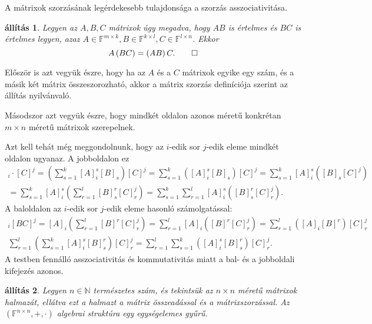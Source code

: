 \documentclass[9pt, a4paper, showtrims]{memoir}
\makeatletter
\renewenvironment{proof}[1][\proofname]
    {\par\pushQED{\qed}%
    \normalfont \topsep6\p@\@plus6\p@\relax
    \trivlist
    \item[\hskip\labelsep
        \itshape
    #1\@addpunct{:}]\ignorespaces}
    {\popQED\endtrivlist\@endpefalse}
\theoremstyle{plain}
\newtheorem{proposition}{állítás}[chapter]
\theoremstyle{remark}
\theoremstyle{definition}
\makeatother
\begin{document}
A mátrixok szorzásának legérdekesebb tulajdonsága a szorzás asszociativitása.
\begin{proposition}
    Legyen az $A,B,C$ mátrixok úgy megadva, hogy $AB$ is értelmes és $BC$ is értelmes legyen, 
    azaz $A\in\mathbb{F}^{m\times k},B\in\mathbb{F}^{k\times l}, C\in\mathbb{F}^{l\times n}$.
    Ekkor
    \[
        A\left( BC \right)=\left( AB \right)C.\qedhere
    \]
\end{proposition}
\begin{proof}
    Először is azt vegyük észre, 
    hogy ha az $A$ és a $C$ mátrixok egyike egy szám, 
    és a másik két mátrix összeszorozható, 
    akkor a mátrix szorzás definíciója szerint az állítás nyilvánvaló.

    Másodszor azt vegyük észre, hogy mindkét oldalon azonos méretű 
    konkrétan $m\times n$ méretű mátrixok szerepelnek.

    Azt kell tehát még meggondolnunk,
    hogy az $i$-edik sor $j$-edik eleme mindkét oldalon ugyanaz.
    A jobboldalon ez
    \begin{multline*}
        [AB]_i\cdot [C]^j
        =
        \left( \sum_{s=1}^k[A]_i^s[B]_s \right)[C]^j
        =
        \sum_{s=1}^k\left([A]_i^s[B]_s\right)[C]^j
        =
        \sum_{s=1}^k[A]_i^s\left([B]_s[C]^j\right)
        \\
        =
        \sum_{s=1}^k[A]_i^s\left(\sum_{r=1}^l[B]_s^r[C]_r^j\right)
        =
        \sum_{s=1}^k\sum_{r=1}^l[A]_i^s([B]_s^r[C]_r^j).
    \end{multline*}
    A baloldalon
    az $i$-edik sor $j$-edik eleme hasonló számolgatással:
    \begin{multline*}
        [A]_i[BC]^j=
        [A]_i\left( \sum_{r=1}^l[B]^r[C]_r^j \right)
        =
        \sum_{r=1}^l[A]_i\left([B]^r[C]_r^j\right)
        =
        \sum_{r=1}^l\left([A]_i[B]^r\right)[C]_r^j
        \\
        \sum_{r=1}^l\left(\sum_{s=1}^k[A]_i^s[B]_s^r\right)[C]_r^j
        =
        \sum_{r=1}^l\sum_{s=1}^k\left([A]_i^s[B]_s^r\right)[C]_r^j.
    \end{multline*}
    A testben fennálló asszociativitás és kommutativitás miatt a bal- és a jobboldali kifejezés azonos.
\end{proof}
\begin{proposition}
    Legyen $n\in\mathbb{N}$ természetes szám, és tekintsük az $n\times n$ méretű mátrixok
    halmazát, ellátva ezt a halmazt a mátrix összeadással és a mátrixszorzással.
    Az $\left( \mathbb{F}^{n\times n},+,\cdot \right)$ algebrai struktúra egy egységelemes gyűrű.
\end{proposition}
\end{document}
